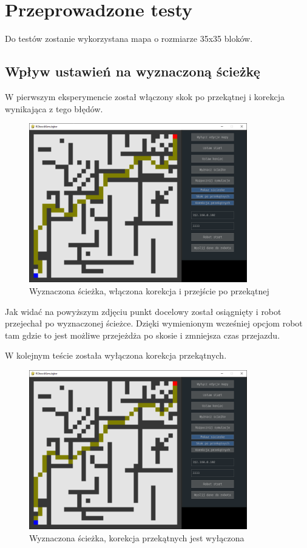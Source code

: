 \section{Przeprowadzone testy}

Do testów zostanie wykorzystana mapa o rozmiarze 35x35 bloków.

\subsection{Wpływ ustawień na wyznaczoną ścieżkę}

W pierwszym eksperymencie został włączony skok po
przekątnej i korekcja wynikająca z tego błędów.

\begin{figure}[H]
	\centering
	\includegraphics[width=9.5cm]{pages/testy/zdjecia/t2_1.png}
	\caption{Wyznaczona ścieżka, włączona korekcja i przejście po przekątnej}
\end{figure}

Jak widać na powyższym zdjęciu punkt docelowy został osiągnięty i robot przejechał po wyznaczonej ścieżce.
Dzięki wymienionym wcześniej opcjom robot tam gdzie to jest możliwe przejeżdża po skosie i zmniejsza czas przejazdu. 

W kolejnym teście została wyłączona korekcja przekątnych.
\begin{figure}[H]
	\centering
	\includegraphics[width=9.5cm]{pages/testy/zdjecia/t2_2.png}
	\caption{Wyznaczona ścieżka, korekcja przekątnych jest wyłączona}
\end{figure}

